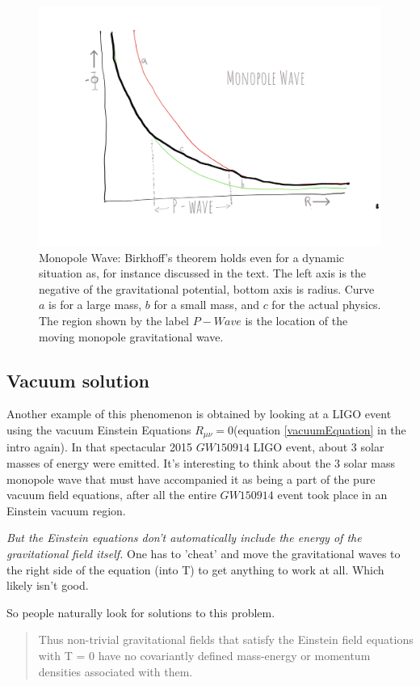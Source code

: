 \documentclass[../rzero]{subfiles}
\begin{document}
\begin{figure}\label{monopoleFigure}
\includegraphics[width=\textwidth]{chapters/images/monopole.png}
\caption{Monopole Wave: Birkhoff's theorem holds even for a dynamic situation as, for instance discussed in the text. The left axis is the negative of the gravitational potential, bottom axis is radius. Curve $a$ is for a large mass, $b$ for a small mass, and $c$ for the actual physics. The region shown by the label $P - Wave$ is the location of the moving monopole gravitational wave.}
\end{figure}


\subsection{Vacuum solution}
Another example of this phenomenon is obtained by looking at a LIGO\cite{abbott2016gw150914} event using the vacuum Einstein Equations $R_{\mu\nu} = 0$(equation \ref{vacuumEquation} in the intro again). In that spectacular 2015 $GW150914$ LIGO event, about 3 solar masses of energy were emitted. It's interesting to think about the 3 solar mass monopole wave that must have accompanied it as being a part of the pure vacuum field equations, after all the entire $GW150914$ event took place in an Einstein vacuum region.   

\textit{But the Einstein equations don't automatically include the energy of the gravitational field itself.} One has to 'cheat' and move the gravitational waves to the right side of the equation (into T) to get anything to work at all. Which likely isn't good. 

So people naturally look for solutions to this problem. \cite{dereliEnergyMomentumDensityGravitational2004}  
\begin{quotation}
	Thus non-trivial gravitational fields that satisfy the Einstein field equations with T = 0 have no covariantly defined mass-energy or momentum densities associated with them.
\end{quotation}
\end{document}
